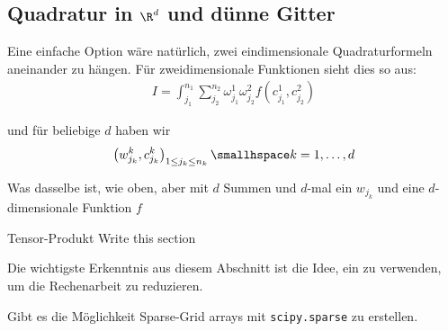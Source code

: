 \newsection
\subsection{Quadratur in $\R^d$ und dünne Gitter}
Eine einfache Option wäre natürlich, zwei eindimensionale Quadraturformeln aneinander zu hängen.
Für zweidimensionale Funktionen sieht dies so aus:
\rmvspace
\begin{align*}
    I = \int_{j_1}^{n_1} \sum_{j_2}^{n_2} \omega_{j_1}^1 \omega_{j_2}^2 f(c_{j_1}^1, c_{j_2}^2)
\end{align*}

\drmvspace
und für beliebige $d$ haben wir
\rmvspace
\begin{align*}
    \left( w_{j_k}^k, c_{j_k}^k \right)_{1 \leq j_k \leq n_k} \smallhspace k = 1, \ldots, d
\end{align*}

\drmvspace
Was dasselbe ist, wie oben, aber mit $d$ Summen und $d$-mal ein $w_{j_k}$ und eine $d$-dimensionale Funktion $f$


\begin{recall}[]{Tensor-Produkt}
    \TODO Write this section
\end{recall}

Die wichtigste Erkenntnis aus diesem Abschnitt ist die Idee, ein  zu verwenden, um die Rechenarbeit zu reduzieren.

\innumpy Gibt es die Möglichkeit Sparse-Grid arrays mit \texttt{scipy.sparse} zu erstellen.
